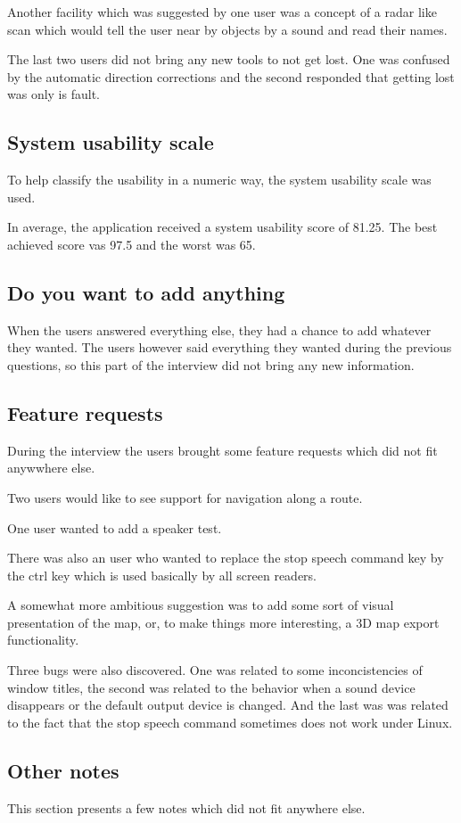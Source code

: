 \documentclass[nolof,digital]{fithesis3}
\begin{document}
Another facility which was suggested by one user was a concept of a radar like scan which would tell the user near by objects by a sound and read their names.

The last two users did not bring any new tools to not get lost. One was confused by the automatic direction corrections and the second responded that getting lost was only is fault.
\subsection{System usability scale}
To help classify the usability in a numeric way, the system usability scale was used.

In average, the application received a system usability score of 81.25. The best achieved score vas 97.5 and the worst was 65.

\subsection{Do you want to add anything}
When the users answered everything else, they had a chance to add whatever they wanted. The users however said everything they wanted during the previous questions, so this part of the interview did not bring any new information.
\subsection{Feature requests}

During the interview the users brought some feature requests which did not fit anywwhere else.

Two users would like to see support for navigation along a route.

One user wanted to add a speaker test.

There was also an user who wanted to replace the stop speech command key by the ctrl key which is used basically by all screen readers.

 A somewhat more ambitious suggestion was to add some sort of visual presentation of the map, or, to make things more interesting, a 3D map export functionality.

Three bugs were also discovered. One was related to some inconcistencies of window titles, the second was related to the behavior when a sound device disappears or the default output device is changed. And the last was was related to the fact that the stop speech command sometimes does not work under Linux.
\subsection{Other notes}
This section presents a few notes which did not fit anywhere else.
\end{document}
